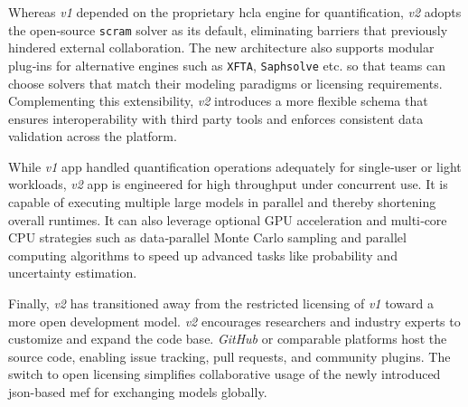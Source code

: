 Whereas \textit{v1} depended on the proprietary \acrshort{hcla} engine for quantification, \textit{v2} adopts the open‑source \texttt{scram} solver as its default, eliminating barriers that previously hindered external collaboration. The new architecture also supports modular plug‑ins for alternative engines such as \texttt{XFTA}, \texttt{Saphsolve} etc. so that teams can choose solvers that match their modeling paradigms or licensing requirements. Complementing this extensibility, \textit{v2} introduces a more flexible schema that ensures interoperability with third party tools and enforces consistent data validation across the platform.

While \textit{v1} app handled quantification operations adequately for single‑user or light workloads, \textit{v2} app is engineered for high throughput under concurrent use. It is capable of executing multiple large models in parallel and thereby shortening overall runtimes. It can also leverage optional GPU acceleration and multi‑core CPU strategies such as data‑parallel Monte Carlo sampling and parallel computing algorithms to speed up advanced tasks like probability and uncertainty estimation.

Finally, \textit{v2} has transitioned away from the restricted licensing of \textit{v1} toward a more open development model. \textit{v2} encourages researchers and industry experts to customize and expand the code base. \textit{GitHub} or comparable platforms host the source code, enabling issue tracking, pull requests, and community plugins. The switch to open licensing simplifies collaborative usage of the newly introduced \acrshort{json}-based \acrshort{mef} for exchanging models globally.